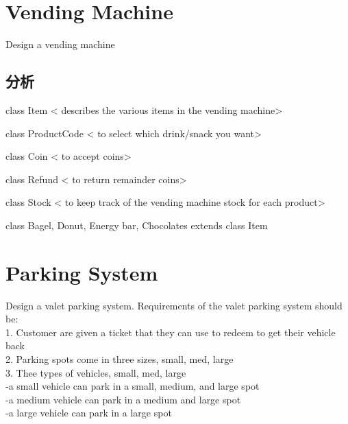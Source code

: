 \section{Vending Machine}
Design a vending machine

\subsection{分析}
class Item < describes the various items in the vending machine>

class ProductCode < to select which drink/snack you want>

class Coin < to accept coins>

class Refund < to return remainder coins>

class Stock < to keep track of the vending machine stock for each product>

class Bagel, Donut, Energy bar, Chocolates extends class Item

\section{Parking System}
Design a valet parking system. Requirements of the valet parking system should be: \\
1. Customer are given a ticket that they can use to redeem to get their vehicle back \\
2. Parking spots come in three sizes, small, med, large \\
3. Thee types of vehicles, small, med, large \\
-a small vehicle can park in a small, medium, and large spot \\
-a medium vehicle can park in a medium and large spot \\
-a large vehicle can park in a large spot\\

